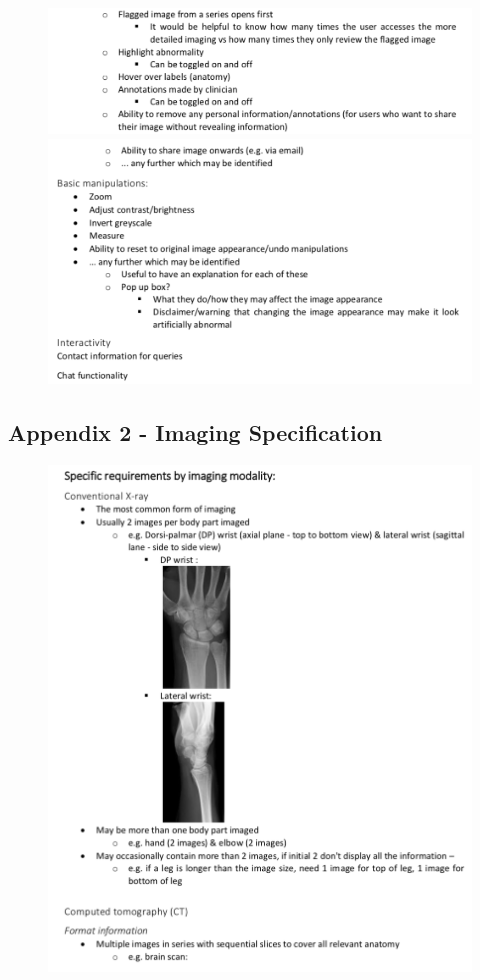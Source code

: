 \documentclass[12pt,twoside]{article}
\begin{document}
\begin{appendices}
\begin{figure}[ht]
\centering
\includegraphics[width = 0.95\hsize]{./figures/GeneralSpec3}
\includegraphics[width = 0.95\hsize]{./figures/GeneralSpec4}
\end{figure}

\clearpage

\subsection {Appendix 2 - Imaging Specification}

\begin{figure}[ht]
\centering
\includegraphics[width = 0.95\hsize]{./figures/ImagingSpec1}
\end{figure}
\clearpage


\end{appendices}
\end{document}
